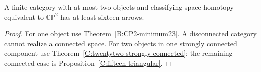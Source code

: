 \begin{corollary}\label{C:fifteen-two-objects}
A finite category with at most two objects and classifying space
homotopy equivalent to $\mathbb{CP}^2$ has at least sixteen arrows.
\end{corollary}
\begin{proof}
For one object use Theorem~\ref{B:CP2-minimum23}.
A disconnected category cannot realize a connected space.
For two objects in one strongly connected component use
Theorem~\ref{C:twentytwo-strongly-connected}; the remaining
connected case is Proposition~\ref{C:fifteen-triangular}.
\end{proof}
